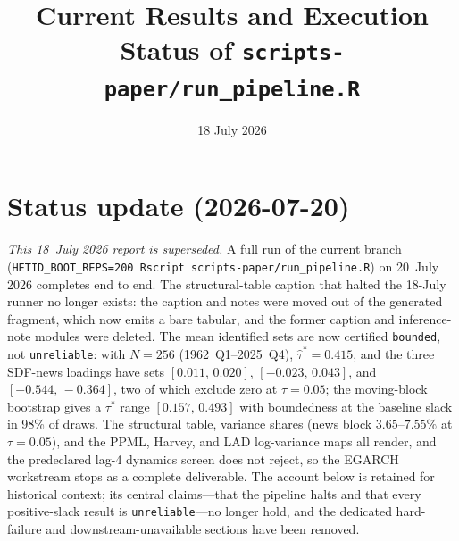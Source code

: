 \documentclass[11pt]{article}
\title{Current Results and Execution Status of
  \texttt{scripts-paper/run\_pipeline.R}}
\author{}
\date{18 July 2026}
\begin{document}
\maketitle

\section*{Status update (2026-07-20)}

\emph{This 18~July 2026 report is superseded.} A full run of the current
branch (\texttt{HETID\_BOOT\_REPS=200 Rscript
scripts-paper/run\_pipeline.R}) on 20~July 2026 completes end to end. The
structural-table caption that halted the 18-July runner no longer exists:
the caption and notes were moved out of the generated fragment, which now
emits a bare tabular, and the former caption and inference-note modules were
deleted. The mean identified sets are now certified \texttt{bounded}, not
\texttt{unreliable}: with $N=256$ (1962~Q1--2025~Q4),
$\widehat\tau^\ast=0.415$, and the three SDF-news loadings have sets
$[0.011,\,0.020]$, $[-0.023,\,0.043]$, and $[-0.544,\,-0.364]$, two of
which exclude zero at $\tau=0.05$; the moving-block bootstrap gives a
$\tau^\ast$ range $[0.157,\,0.493]$ with boundedness at the baseline slack
in 98\% of draws. The structural table, variance shares (news block
$3.65$--$7.55\%$ at $\tau=0.05$), and the PPML, Harvey, and LAD
log-variance maps all render, and the predeclared lag-4 dynamics screen does
not reject, so the EGARCH workstream stops as a complete deliverable. The
account below is retained for historical context; its central claims---that
the pipeline halts and that every positive-slack result is
\texttt{unreliable}---no longer hold, and the dedicated hard-failure and
downstream-unavailable sections have been removed.
\end{document}
